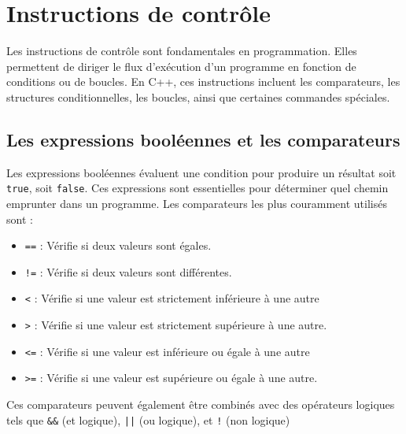 


\chapter{Instructions de contrôle}

Les instructions de contrôle sont fondamentales en programmation. Elles permettent de diriger le flux d'exécution d’un programme en fonction de conditions ou de boucles. En C++, ces instructions incluent les comparateurs, les structures conditionnelles, les boucles, ainsi que certaines commandes spéciales.

\section{Les expressions booléennes et les comparateurs}

Les expressions booléennes évaluent une condition pour produire un résultat soit \lstinline[]|true|, soit \lstinline[]|false|. Ces expressions sont essentielles pour déterminer quel chemin emprunter dans un programme. Les comparateurs les plus couramment utilisés sont :


\begin{itemize}
	\item \lstinline[]|==| : Vérifie si deux valeurs sont égales.
	\item \lstinline[]|!=| : Vérifie si deux valeurs sont différentes.
	\item \lstinline[]|<| : Vérifie si une valeur est strictement inférieure à une autre
	\item \lstinline[]|>| : Vérifie si une valeur est strictement supérieure à une autre.
	\item \lstinline[]|<=| : Vérifie si une valeur est inférieure ou égale à une autre
	\item \lstinline[]|>=| : Vérifie si une valeur est supérieure ou égale à une autre.
\end{itemize}


Ces comparateurs peuvent également être combinés avec des opérateurs logiques tels que \lstinline|&&| (et logique), \lstinline/||/ (ou logique), et \lstinline|!| (non logique)





